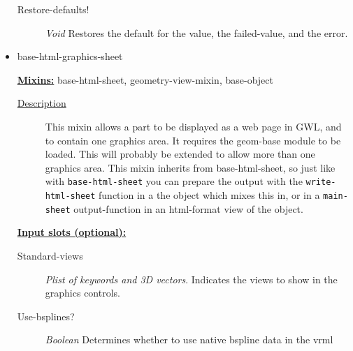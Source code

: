 \documentclass [11pt]{book}
\begin{document}
\begin{itemize}
\begin{description}
\item [Restore-defaults!]
\emph{Void} Restores the default for the value, the failed-value, and the error.


\end{description}







\item {}base-html-graphics-sheet


\textbf{
\underline{Mixins:}} base-html-sheet, geometry-view-mixin, base-object





\begin{description}

\item [
\underline{Description}]


This mixin allows a part to be displayed as a web page in GWL, and
to contain one graphics area. It requires the geom-base module to be loaded. This will 
probably be extended to allow more than one graphics area. This mixin inherits from 
base-html-sheet, so just like with \texttt{base-html-sheet} you can prepare the output 
with the \texttt{write-html-sheet} function  in a the object which mixes  this in, or 
in a \texttt{main-sheet} output-function in an html-format view of the object.






\end{description}








\textbf{
\underline{Input slots (optional):}}

\begin{description}

\item [Standard-views]
\emph{Plist of keywords and 3D vectors}.
Indicates the views to show in the graphics controls.


\item [Use-bsplines?]
\emph{Boolean} Determines whether to use native bspline data in the vrml


\end{description}







\end{itemize}
\end{document}
